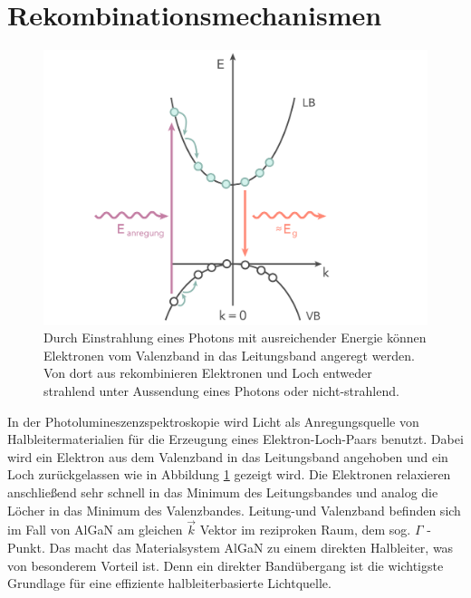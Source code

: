 
\thispagestyle{fancy}


\section{Rekombinationsmechanismen}
%
\begin{figure}[h]
\centering
\begin{minipage}[t]{1\linewidth}
\centering
\includegraphics[width=0.8\linewidth]{Bilder/bandrekomb.png}
\end{minipage}%
\caption{Durch Einstrahlung eines Photons mit ausreichender Energie können Elektronen vom Valenzband in das Leitungsband angeregt werden. Von dort aus rekombinieren Elektronen und Loch entweder strahlend unter Aussendung eines Photons oder nicht-strahlend.}
 \label{fig:bandrekomb}
\end{figure}
\noindent
In der Photolumineszenzspektroskopie wird Licht als Anregungsquelle von Halbleitermaterialien für die Erzeugung eines Elektron-Loch-Paars benutzt. Dabei wird ein Elektron aus dem Valenzband in das Leitungsband angehoben und ein Loch zurückgelassen wie in Abbildung \ref{fig:bandrekomb} gezeigt wird. Die Elektronen relaxieren anschließend sehr schnell in das Minimum des Leitungsbandes und analog die Löcher in das Minimum des Valenzbandes. 
Leitung-und Valenzband befinden sich im Fall von AlGaN am gleichen $\vec{k}$ Vektor im reziproken Raum, dem sog. $\Gamma$ -Punkt. Das macht das Materialsystem AlGaN zu einem direkten Halbleiter, was von besonderem Vorteil ist. Denn ein direkter Bandübergang ist die wichtigste Grundlage für eine effiziente halbleiterbasierte Lichtquelle. 
